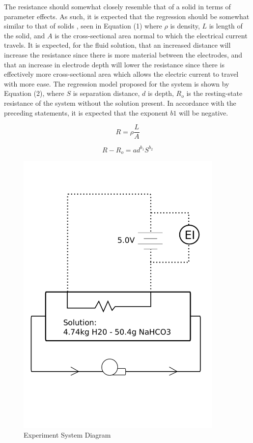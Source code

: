 \documentclass[12pt]{article}
\begin{document}
The resistance should somewhat closely resemble that of a solid in terms of parameter effects. As such, it is expected that the regression should be somewhat similar to that of solids \cite{physics_book}, seen in Equation (1) where $\rho$ is density, $L$ is length of the solid, and $A$ is the cross-sectional area normal to which the electrical current travels. It is expected, for the fluid solution, that an increased distance will increase the resistance since there is more material between the electrodes, and that an increase in electrode depth will lower the resistance since there is effectively more cross-sectional area which allows the electric current to travel with more ease. The regression model proposed for the system is shown by Equation (2), where $S$ is separation distance, $d$ is depth, $R_o$ is the resting-state resistance of the system without the solution present. In accordance with the preceding statements, it is expected that the exponent $b1$ will be negative.
\bigskip

\begin{equation}
R = \rho\frac{L}{A}
\end{equation}

\begin{equation}
R-R_o = ad^{b_1}S^{b_2}
\end{equation}


\newpage

\begin{figure}[t!] %
   \centering
   \includegraphics[width=4in]{system_diagram.pdf} 
   \caption{Experiment System Diagram}
   \label{fig:example}
\end{figure}
\end{document}
